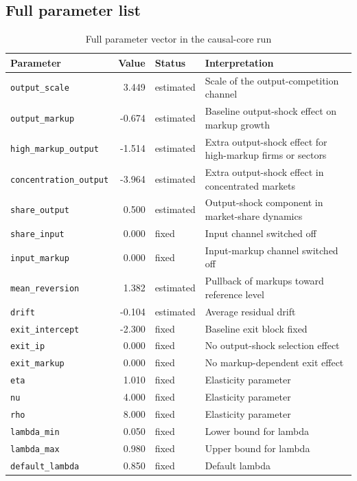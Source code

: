\documentclass[11pt,a4paper]{article}
\begin{document}
\subsection{Full parameter list}

\begin{table}[H]
\centering
\caption{Full parameter vector in the causal-core run}
\begin{threeparttable}
\small
\begin{tabular}{lrlp{7.2cm}}
\toprule
Parameter & Value & Status & Interpretation \\
\midrule
\texttt{output\_scale} & 3.449 & estimated & Scale of the output-competition channel \\
\texttt{output\_markup} & -0.674 & estimated & Baseline output-shock effect on markup growth \\
\texttt{high\_markup\_output} & -1.514 & estimated & Extra output-shock effect for high-markup firms or sectors \\
\texttt{concentration\_output} & -3.964 & estimated & Extra output-shock effect in concentrated markets \\
\texttt{share\_output} & 0.500 & estimated & Output-shock component in market-share dynamics \\
\texttt{share\_input} & 0.000 & fixed & Input channel switched off \\
\texttt{input\_markup} & 0.000 & fixed & Input-markup channel switched off \\
\texttt{mean\_reversion} & 1.382 & estimated & Pullback of markups toward reference level \\
\texttt{drift} & -0.104 & estimated & Average residual drift \\
\texttt{exit\_intercept} & -2.300 & fixed & Baseline exit block fixed \\
\texttt{exit\_ip} & 0.000 & fixed & No output-shock selection effect \\
\texttt{exit\_markup} & 0.000 & fixed & No markup-dependent exit effect \\
\texttt{eta} & 1.010 & fixed & Elasticity parameter \\
\texttt{nu} & 4.000 & fixed & Elasticity parameter \\
\texttt{rho} & 8.000 & fixed & Elasticity parameter \\
\texttt{lambda\_min} & 0.050 & fixed & Lower bound for lambda \\
\texttt{lambda\_max} & 0.980 & fixed & Upper bound for lambda \\
\texttt{default\_lambda} & 0.850 & fixed & Default lambda \\
\bottomrule
\end{tabular}
\end{threeparttable}
\end{table}
\end{document}

